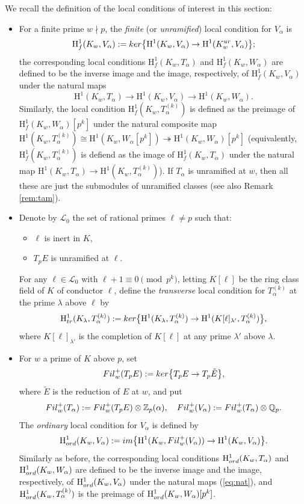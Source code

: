 \documentclass[10pt,reqno]{amsart}
\numberwithin{equation}{section}
\theoremstyle{plain}
\theoremstyle{definition}
\theoremstyle{definition}
\theoremstyle{plain}
\theoremstyle{plain}
\theoremstyle{plain}
\theoremstyle{plain}
\theoremstyle{plain}
\theoremstyle{plain}
\newcommand{\Z}{\mathbb{Z}}
\newcommand{\Q}{\mathbb{Q}}
\newcommand{\cL}{\mathcal{L}}
\newcommand{\rH}{\mathrm{H}}
\begin{document}
We recall the definition of the local conditions of interest in this section:
\begin{itemize}
\item For a finite prime $w\nmid p$, the \emph{finite} (or \emph{unramified}) local condition  for $V_\alpha$ is
\[
\rH^1_f(K_w,V_{\alpha}):={\rm ker}\bigl\{\rH^1(K_w,V_{\alpha})\rightarrow\rH^1(K_w^{\rm ur},V_{\alpha})\bigr\}; 
\]
the corresponding local conditions $\rH^1_f(K_w,T_\alpha)$ and $\rH^1_f(K_w,W_\alpha)$ are defined to be the inverse image and the image, respectively, of $\rH^1_f(K_w,V_\alpha)$ under the natural maps  
\begin{equation}\label{eq:nat}
\rH^1(K_w,T_\alpha)\rightarrow\rH^1(K_w,V_\alpha)\rightarrow\rH^1(K_w,W_\alpha).
\end{equation}
Similarly, the local condition $\rH^1_f(K_w,T_\alpha^{(k)})$ is defined as the preimage of $\rH^1_f(K_w,W_\alpha)[p^k]$ under the natural composite map
$\rH^1(K_w,T_\alpha^{(k)})\cong\rH^1(K_w,W_\alpha[p^k])\twoheadrightarrow \rH^1(K_w,W_\alpha)[p^k]$ (equivalently, $\rH^1_f(K_w,T_\alpha^{(k)})$ is defiend as the image of $\rH^1_f(K_w,T_\alpha)$ under the natural map $\rH^1(K_w,T_\alpha)\rightarrow\rH^1(K_w,T_\alpha^{(k)})$). If $T_\alpha$ is unramified at $w$, then all these 
are just the submodules of unramified classes (see also Remark \ref{rem:tam}).
\item Denote by $\cL_0$ the set of rational primes $\ell\neq p$ such that:
\begin{itemize}
\item $\ell$ is inert in $K$,
\item $T_pE$ is unramified at $\ell$.
\end{itemize}
For any $\ell\in\cL_0$ with $\ell+1\equiv 0\pmod{p^k}$, letting $K[\ell]$ be the ring class field of $K$ of conductor $\ell$, define the \emph{transverse} local condition for $T_\alpha^{(k)}$ at the prime $\lambda$ above $\ell$ by
\[
\rH^1_{\rm tr}(K_\lambda,T_{\alpha}^{(k)}):={\rm ker}\bigl\{\rH^1(K_\lambda,T_{\alpha}^{(k)})\rightarrow\rH^1(K[\ell]_{\lambda'},T_{\alpha}^{(k)})\bigr\},
\]
where $K[\ell]_{\lambda'}$ is the completion of $K[\ell]$ at any prime $\lambda'$ above $\lambda$.
\item For $w$ a prime of $K$ above $p$, set 
\[
{\rm Fil}_w^+(T_pE):={\rm ker}\bigl\{T_pE\rightarrow T_p\tilde{E}\bigr\},
\]
where $\tilde{E}$ is the reduction of $E$ at $w$, and put
\[
{\rm Fil}_w^+(T_\alpha):={\rm Fil}_w^+(T_pE)\otimes\Z_p(\alpha),\quad{\rm Fil}_w^+(V_\alpha):={\rm Fil}_w^+(T_\alpha)\otimes\Q_p.
\]
The \emph{ordinary} local condition for $V_\alpha$ is defined by 
\[
\rH^1_{\rm ord}(K_w,V_\alpha):={\rm im}\bigl\{\rH^1(K_w,{\rm Fil}_w^+(V_\alpha))\rightarrow\rH^1(K_w,V_\alpha)\bigr\}.
\]
Similarly as before, the corresponding local conditions $\rH^1_{\rm ord}(K_w,T_\alpha)$ and $\rH^1_{\rm ord}(K_w,W_\alpha)$ are defined to be the inverse image and the image, respectively, of $\rH^1_{\rm ord}(K_w,V_\alpha)$ under the natural maps (\ref{eq:nat}), and $\rH^1_{\rm ord}(K_w,T_\alpha^{(k)})$ is the preimage
of $\rH^1_{\rm ord}(K_w,W_\alpha)[p^k]$.
\end{itemize}
\end{document}
